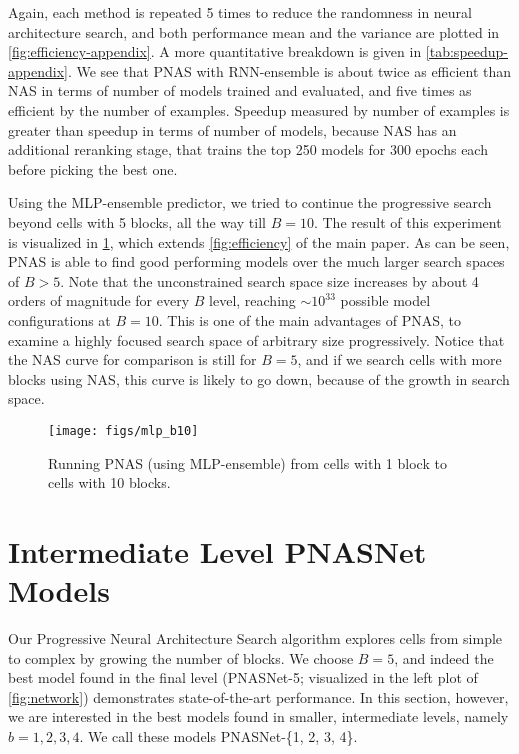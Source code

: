 \documentclass[runningheads]{llncs}
\begin{document}
Again, each method is repeated 5 times to reduce the randomness in neural architecture search, and both performance mean and the variance are plotted in \cref{fig:efficiency-appendix}.
A more quantitative breakdown is given in \cref{tab:speedup-appendix}.
We see that PNAS with RNN-ensemble is about twice as efficient than NAS in terms of number of models trained and evaluated, and five times as efficient by the number of examples.
Speedup measured by number of examples is greater than speedup in terms of number of models, because NAS has an additional reranking stage, that trains the top 250 models for 300 epochs each before picking the best one.


Using the MLP-ensemble predictor, we tried to continue the progressive search beyond cells with 5 blocks, all the way till $B = 10$.
The result of this experiment is visualized in \cref{fig:b10}, which extends \cref{fig:efficiency} of the main paper.
As can be seen, PNAS is able to find good performing models over the much larger search spaces of $B>5$. Note that the unconstrained search space size increases by about 4 orders of magnitude for every $B$ level, reaching $\sim 10^{33}$ possible model configurations at $B=10$. This is one of the main advantages of PNAS, to examine a highly focused search space of arbitrary size progressively.
Notice that the NAS curve for comparison is still for $B = 5$, and if we search cells with more blocks using NAS, this curve is likely to go down, because of the growth in search space.

\begin{figure}[h]
\centering 
\texttt{[image: figs/mlp\_b10]}
\caption{Running PNAS (using MLP-ensemble) from cells with 1 block to cells with 10 blocks.}
\label{fig:b10}
\end{figure}\section{Intermediate Level PNASNet Models}

Our Progressive Neural Architecture Search algorithm explores cells from simple to complex by growing the number of blocks.
We choose $B=5$, and indeed the best model found in the final level (PNASNet-5; visualized in the left plot of \cref{fig:network}) demonstrates state-of-the-art performance.
In this section, however, we are interested in the best models found in smaller, intermediate levels, namely $b = 1, 2, 3, 4$.
We call these models PNASNet-\{1, 2, 3, 4\}.
\end{document}
